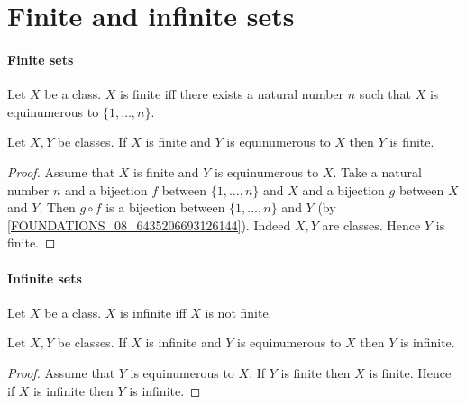 \documentclass[../arithmetic.tex]{subfiles}
\begin{document}
  \section{Finite and infinite sets}

  \paragraph{Finite sets}

  \begin{forthel}
    \begin{definition}
      Let $X$ be a class.
      $X$ is finite iff there exists a natural number $n$ such that $X$ is
      equinumerous to $\{ 1, \dots, n \}$.
    \end{definition}
  \end{forthel}

  \begin{forthel}
    \begin{proposition}
      Let $X, Y$ be classes.
      If $X$ is finite and $Y$ is equinumerous to $X$ then $Y$ is finite.
    \end{proposition}
    \begin{proof}
      Assume that $X$ is finite and $Y$ is equinumerous to $X$.
      Take a natural number $n$ and a bijection $f$ between $\{ 1, \dots, n \}$
      and $X$ and a bijection $g$ between $X$ and $Y$.
      Then $g \circ f$ is a bijection between $\{ 1, \dots, n \}$ and $Y$
      (by \cref{FOUNDATIONS_08_6435206693126144}).
      Indeed $X, Y$ are classes.
      Hence $Y$ is finite.
    \end{proof}
  \end{forthel}


  \paragraph{Infinite sets}

  \begin{forthel}
    \begin{definition}
      Let $X$ be a class.
      $X$ is infinite iff $X$ is not finite.
    \end{definition}
  \end{forthel}

  \begin{forthel}
    \begin{proposition}
      Let $X, Y$ be classes.
      If $X$ is infinite and $Y$ is equinumerous to $X$ then $Y$ is infinite.
    \end{proposition}
    \begin{proof}
      Assume that $Y$ is equinumerous to $X$.
      If $Y$ is finite then $X$ is finite.
      Hence if $X$ is infinite then $Y$ is infinite.
    \end{proof}
  \end{forthel}
\end{document}
